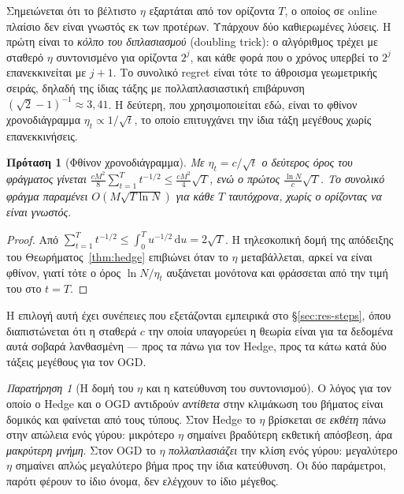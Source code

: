 \documentclass[12pt,a4paper,oneside]{report}
\newcommand{\en}[1]{\textenglish{#1}}
\renewcommand{\_}{\oldunderscore\allowbreak}
\theoremstyle{definition}
\theoremstyle{plain}
\newtheorem{proposition}[theorem]{Πρόταση}
\theoremstyle{remark}
\newtheorem{remark}[theorem]{Παρατήρηση}
\begin{document}
Σημειώνεται ότι το βέλτιστο $\eta$ εξαρτάται από τον ορίζοντα $T$, ο οποίος σε online
πλαίσιο δεν είναι γνωστός εκ των προτέρων. Υπάρχουν δύο καθιερωμένες λύσεις. Η πρώτη είναι
το \emph{κόλπο του διπλασιασμού} (\en{doubling trick}): ο αλγόριθμος τρέχει με σταθερό $\eta$
συντονισμένο για ορίζοντα $2^j$, και κάθε φορά που ο χρόνος υπερβεί το $2^j$ επανεκκινείται
με $j\!+\!1$. Το συνολικό regret είναι τότε το άθροισμα γεωμετρικής σειράς, δηλαδή της ίδιας
τάξης με πολλαπλασιαστική επιβάρυνση $(\sqrt{2}-1)^{-1}\!\approx\!3{,}41$. Η δεύτερη, που
χρησιμοποιείται εδώ, είναι το φθίνον χρονοδιάγραμμα $\eta_t \propto 1/\sqrt{t}$, το οποίο
επιτυγχάνει την ίδια τάξη μεγέθους χωρίς επανεκκινήσεις.

\begin{proposition}[Φθίνον χρονοδιάγραμμα]
\label{prop:anytime}
Με $\eta_t = c/\sqrt{t}$ ο δεύτερος όρος του φράγματος γίνεται
$\frac{c M^2}{8}\sum_{t=1}^{T} t^{-1/2} \leq \frac{c M^2}{4}\sqrt{T}$, ενώ ο πρώτος
$\frac{\ln N}{c}\sqrt{T}$. Το συνολικό φράγμα παραμένει $O(M\sqrt{T\ln N})$ για κάθε $T$
ταυτόχρονα, χωρίς ο ορίζοντας να είναι γνωστός.
\end{proposition}

\begin{proof}
Από $\sum_{t=1}^{T} t^{-1/2} \leq \int_0^T u^{-1/2}\,\mathrm{d}u = 2\sqrt{T}$. Η τηλεσκοπική
δομή της απόδειξης του Θεωρήματος~\ref{thm:hedge} επιβιώνει όταν το $\eta$ μεταβάλλεται,
αρκεί να είναι φθίνον, γιατί τότε ο όρος $\ln N/\eta_t$ αυξάνεται μονότονα και φράσσεται από
την τιμή του στο $t=T$.
\end{proof}

Η επιλογή αυτή έχει συνέπειες που εξετάζονται εμπειρικά στο \S\ref{sec:res-steps}, όπου
διαπιστώνεται ότι η σταθερά $c$ την οποία υπαγορεύει η θεωρία είναι για τα δεδομένα αυτά
σοβαρά λανθασμένη --- προς τα πάνω για τον Hedge, προς τα κάτω κατά δύο τάξεις μεγέθους για
τον OGD.

\begin{remark}[Η δομή του $\eta$ και η κατεύθυνση του συντονισμού]
Ο λόγος για τον οποίο ο Hedge και ο OGD αντιδρούν \emph{αντίθετα} στην κλιμάκωση του βήματος
είναι δομικός και φαίνεται από τους τύπους. Στον Hedge το $\eta$ βρίσκεται σε \emph{εκθέτη}
πάνω στην απώλεια ενός γύρου: μικρότερο $\eta$ σημαίνει βραδύτερη εκθετική απόσβεση, άρα
\emph{μακρύτερη μνήμη}. Στον OGD το $\eta$ \emph{πολλαπλασιάζει} την κλίση ενός γύρου:
μεγαλύτερο $\eta$ σημαίνει απλώς μεγαλύτερο βήμα προς την ίδια κατεύθυνση. Οι δύο
παράμετροι, παρότι φέρουν το ίδιο όνομα, δεν ελέγχουν το ίδιο μέγεθος.
\end{remark}
\end{document}
